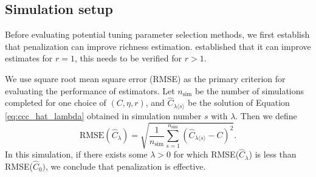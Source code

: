 \documentclass[12pt]{article}
\theoremstyle{break}
\theoremstyle{break}
\begin{document}
\subsection{Simulation setup}

Before evaluating potential tuning parameter selection methods, we first establish that penalization can improve richness estimation.  \citet{wang_2005} established that it can improve estimates for $r = 1$, this needs to be verified for $r> 1$.


We use square root mean square error (RMSE) as the primary criterion for evaluating the performance of estimators.  Let $n_{\text{sim}}$ be the number of simulations completed for one choice of $(C, \eta, r)$, and $\widehat{C}_{\lambda \langle s \rangle}$ be the solution of Equation \eqref{eq:ccc_hat_lambda} obtained in simulation number $s$ with  $\lambda$.  Then we define
\begin{equation}
 \text{RMSE}\left( \widehat{C}_{\lambda} \right) = \sqrt{ \frac{1}{n_{\text{sim}}} \sum_{s=1}^{n_{\text{sim}}} \left( \widehat{C}_{\lambda \langle s \rangle} - C\right)^2 }.
\end{equation}
In this simulation, if there exists some $\lambda > 0$ for which RMSE($\widehat{C}_{\lambda}$) is less than RMSE($\widehat{C}_0)$, we conclude that penalization is effective.
\end{document}

